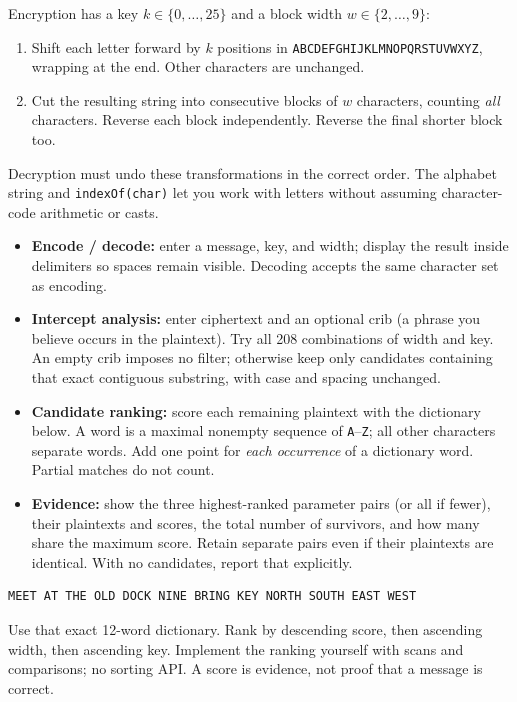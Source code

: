 \documentclass[11pt,a4paper]{article}
\newcommand{\code}[1]{\texttt{#1}}
\newcommand{\sub}[1]{\par\vspace{5pt}{\large\sffamily\bfseries\color{ink}#1}\par\vspace{1pt}}
\begin{document}
Encryption has a key $k\in\{0,\ldots,25\}$ and a block width $w\in\{2,\ldots,9\}$:
\begin{enumerate}
\item Shift each letter forward by $k$ positions in \code{ABCDEFGHIJKLMNOPQRSTUVWXYZ}, wrapping at the end. Other characters are unchanged.
\item Cut the resulting string into consecutive blocks of $w$ characters, counting \emph{all} characters. Reverse each block independently. Reverse the final shorter block too.
\end{enumerate}
Decryption must undo these transformations in the correct order. The alphabet string and \code{indexOf(char)} let you work with letters without assuming character-code arithmetic or casts.

\sub{Your analysis desk must offer}
\begin{itemize}
\item \textbf{Encode / decode:} enter a message, key, and width; display the result inside delimiters so spaces remain visible. Decoding accepts the same character set as encoding.
\item \textbf{Intercept analysis:} enter ciphertext and an optional crib (a phrase you believe occurs in the plaintext). Try all 208 combinations of width and key. An empty crib imposes no filter; otherwise keep only candidates containing that exact contiguous substring, with case and spacing unchanged.
\item \textbf{Candidate ranking:} score each remaining plaintext with the dictionary below. A word is a maximal nonempty sequence of \code{A}--\code{Z}; all other characters separate words. Add one point for \emph{each occurrence} of a dictionary word. Partial matches do not count.
\item \textbf{Evidence:} show the three highest-ranked parameter pairs (or all if fewer), their plaintexts and scores, the total number of survivors, and how many share the maximum score. Retain separate pairs even if their plaintexts are identical. With no candidates, report that explicitly.
\end{itemize}

\begin{lstlisting}
MEET AT THE OLD DOCK NINE BRING KEY NORTH SOUTH EAST WEST
\end{lstlisting}
Use that exact 12-word dictionary. Rank by descending score, then ascending width, then ascending key. Implement the ranking yourself with scans and comparisons; no sorting API. A score is evidence, not proof that a message is correct.
\end{document}
